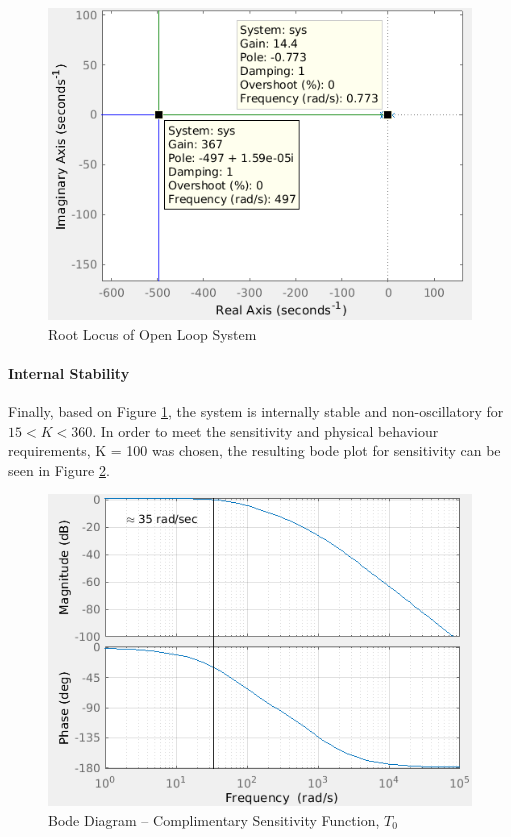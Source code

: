 \documentclass[11pt, a4paper,twocolumn]{article}
\begin{document}
			\begin{figure}[ht!]
			\centering
			\includegraphics[scale=0.4]{rlocus_sys}
			\caption{Root Locus of Open Loop System}
			\label{fig:rlocus_sys}
			\end{figure}									
			
		\paragraph{Internal Stability}
			Finally, based on Figure \ref{fig:rlocus_sys}, the system is internally stable and non-oscillatory for $ 15 < K < 360 $. In order to meet the sensitivity and physical behaviour requirements, K = 100 was chosen, the resulting bode plot for sensitivity can be seen in Figure \ref{fig:bode_T}. 
			
			\begin{figure}[ht!]
			\centering
			\includegraphics[scale=0.4]{bode_T}
			\caption{Bode Diagram -- Complimentary Sensitivity Function, $ T_0 $}
			\label{fig:bode_T}
			\end{figure}
			
\end{document}
